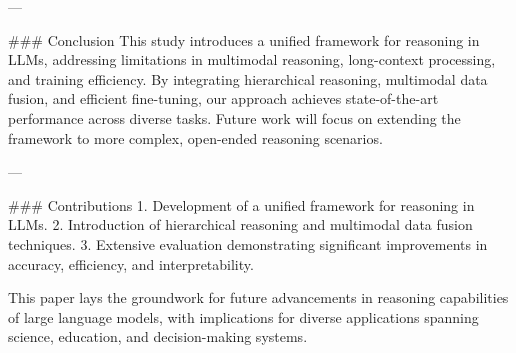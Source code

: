 ---

### Conclusion  
This study introduces a unified framework for reasoning in LLMs, addressing limitations in multimodal reasoning, long-context processing, and training efficiency. By integrating hierarchical reasoning, multimodal data fusion, and efficient fine-tuning, our approach achieves state-of-the-art performance across diverse tasks. Future work will focus on extending the framework to more complex, open-ended reasoning scenarios.

---

### Contributions  
1. Development of a unified framework for reasoning in LLMs.  
2. Introduction of hierarchical reasoning and multimodal data fusion techniques.  
3. Extensive evaluation demonstrating significant improvements in accuracy, efficiency, and interpretability.  

This paper lays the groundwork for future advancements in reasoning capabilities of large language models, with implications for diverse applications spanning science, education, and decision-making systems.